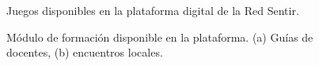 \documentclass[journal,transmag]{IEEEtran}
\begin{document}
\begin{figure}[tbp]
  \centering
	  \hspace{1mm}
  \caption{Juegos disponibles en la plataforma digital de la Red Sentir.}
  \label{fig:juegos}
\end{figure}

\begin{figure}[tbp]
  \centering
	  \hspace{1mm}
  \caption{Módulo de formación disponible en la plataforma. (a) Guías de docentes, (b) encuentros locales.}
  \label{fig:formacion}
\end{figure}
\end{document}
